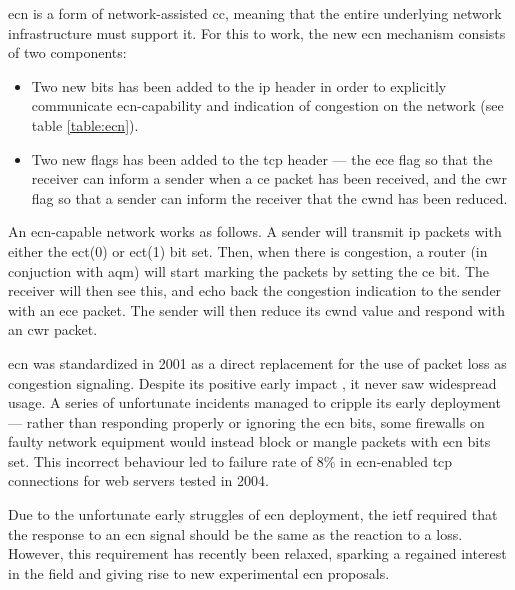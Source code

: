 \gls{ecn} is a form of network-assisted \gls{cc}, meaning that the entire underlying network infrastructure must support it. For this to work, the new \gls{ecn} mechanism consists of two components:

\begin{itemize}
    \item Two new bits has been added to the \gls{ip} header in order to explicitly communicate \gls{ecn}-capability and indication of congestion on the network (see table \ref{table:ecn}).
    \item Two new flags has been added to the \gls{tcp} header --- the \gls{ece} flag so that the receiver can inform a sender when a \gls{ce} packet has been received, and the \gls{cwr} flag so that a sender can inform the receiver that the \gls{cwnd} has been reduced.
\end{itemize}

An \gls{ecn}-capable network works as follows. A sender will transmit \gls{ip} packets with either the \gls{ect}(0) or \gls{ect}(1) bit set. Then, when there is congestion, a router (in conjuction with \gls{aqm}) will start marking the packets by setting the \gls{ce} bit. The receiver will then see this, and echo back the congestion indication to the sender with an \gls{ece} packet. The sender will then reduce its \gls{cwnd} value and respond with an \gls{cwr} packet.

\gls{ecn} was standardized in 2001 as a direct replacement for the use of packet loss as congestion signaling. \cite{rfc3168} Despite its positive early impact \cite{rfc2884}, it never saw widespread usage. \cite{enabling_internet-wide_ecn} A series of unfortunate incidents managed to cripple its early deployment --- rather than responding properly or ignoring the \gls{ecn} bits, some firewalls on faulty network equipment would instead block or mangle packets with \gls{ecn} bits set. This incorrect behaviour led to failure rate of 8\% in \gls{ecn}-enabled \gls{tcp} connections for web servers tested in 2004. \cite{pre-congestion_notification}

Due to the unfortunate early struggles of \gls{ecn} deployment, the \gls{ietf} required that the response to an \gls{ecn} signal should be the same as the reaction to a loss. \cite{rfc3168} However, this requirement has recently been relaxed, \cite{rfc8311} sparking  a regained interest in the field and giving rise to new experimental \gls{ecn} proposals. 

